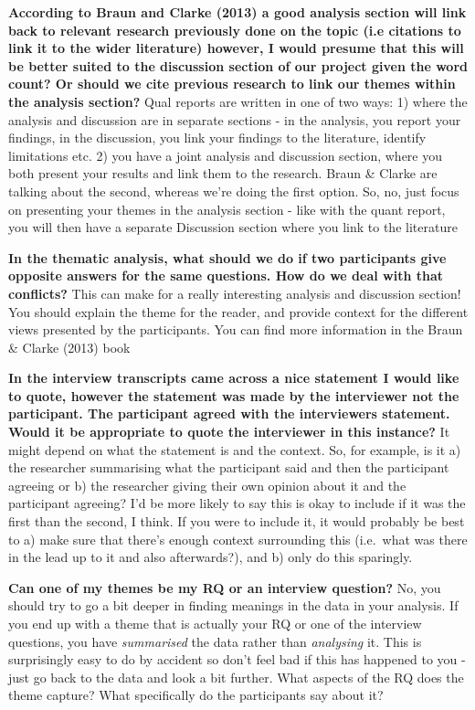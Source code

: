 \documentclass[
  english,
  letterpaper,
  DIV=11,
  numbers=noendperiod]{scrreprt}
\begin{document}
\textbf{According to Braun and Clarke (2013) a good analysis section
will link back to relevant research previously done on the topic (i.e
citations to link it to the wider literature) however, I would presume
that this will be better suited to the discussion section of our project
given the word count? Or should we cite previous research to link our
themes within the analysis section?} Qual reports are written in one of
two ways: 1) where the analysis and discussion are in separate sections
- in the analysis, you report your findings, in the discussion, you link
your findings to the literature, identify limitations etc. 2) you have a
joint analysis and discussion section, where you both present your
results and link them to the research. Braun \& Clarke are talking about
the second, whereas we're doing the first option. So, no, just focus on
presenting your themes in the analysis section - like with the quant
report, you will then have a separate Discussion section where you link
to the literature

\textbf{In the thematic analysis, what should we do if two participants
give opposite answers for the same questions. How do we deal with that
conflicts?} This can make for a really interesting analysis and
discussion section! You should explain the theme for the reader, and
provide context for the different views presented by the participants.
You can find more information in the Braun \& Clarke (2013) book

\textbf{In the interview transcripts came across a nice statement I
would like to quote, however the statement was made by the interviewer
not the participant. The participant agreed with the interviewers
statement. Would it be appropriate to quote the interviewer in this
instance?} It might depend on what the statement is and the context. So,
for example, is it a) the researcher summarising what the participant
said and then the participant agreeing or b) the researcher giving their
own opinion about it and the participant agreeing? I'd be more likely to
say this is okay to include if it was the first than the second, I
think. If you were to include it, it would probably be best to a) make
sure that there's enough context surrounding this (i.e.~what was there
in the lead up to it and also afterwards?), and b) only do this
sparingly.

\textbf{Can one of my themes be my RQ or an interview question?} No, you
should try to go a bit deeper in finding meanings in the data in your
analysis. If you end up with a theme that is actually your RQ or one of
the interview questions, you have \emph{summarised} the data rather than
\emph{analysing} it. This is surprisingly easy to do by accident so
don't feel bad if this has happened to you - just go back to the data
and look a bit further. What aspects of the RQ does the theme capture?
What specifically do the participants say about it?
\end{document}
